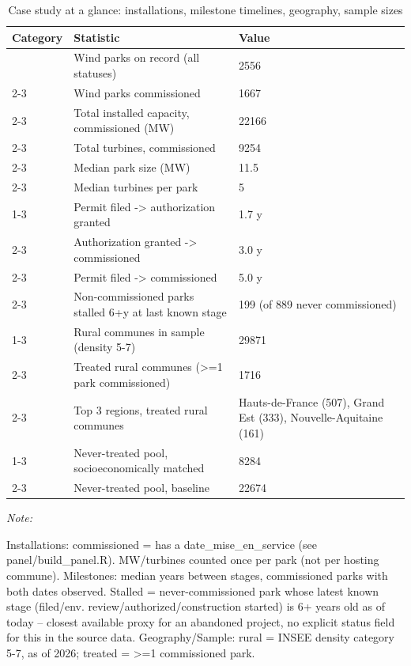 \begin{table}[!h]
\centering
\caption{\label{tab:tab:descriptive_stats}Case study at a glance: installations, milestone timelines, geography, sample sizes}
\centering
\fontsize{9}{11}\selectfont
\begin{threeparttable}
\begin{tabular}[t]{lll}
\toprule
Category & Statistic & Value\\
\midrule
 & Wind parks on record (all statuses) & 2556\\
\cmidrule{2-3}
 & Wind parks commissioned & 1667\\
\cmidrule{2-3}
 & Total installed capacity, commissioned (MW) & 22166\\
\cmidrule{2-3}
 & Total turbines, commissioned & 9254\\
\cmidrule{2-3}
 & Median park size (MW) & 11.5\\
\cmidrule{2-3}
\multirow[t]{-6}{*}{\raggedright\arraybackslash Installations} & Median turbines per park & 5\\
\cmidrule{1-3}
 & Permit filed -> authorization granted & 1.7 y\\
\cmidrule{2-3}
 & Authorization granted -> commissioned & 3.0 y\\
\cmidrule{2-3}
 & Permit filed -> commissioned & 5.0 y\\
\cmidrule{2-3}
\multirow[t]{-4}{*}{\raggedright\arraybackslash Milestones} & Non-commissioned parks stalled 6+y at last known stage & 199 (of 889 never commissioned)\\
\cmidrule{1-3}
 & Rural communes in sample (density 5-7) & 29871\\
\cmidrule{2-3}
 & Treated rural communes (>=1 park commissioned) & 1716\\
\cmidrule{2-3}
\multirow[t]{-3}{*}{\raggedright\arraybackslash Geography} & Top 3 regions, treated rural communes & Hauts-de-France (507), Grand Est (333), Nouvelle-Aquitaine (161)\\
\cmidrule{1-3}
 & Never-treated pool, socioeconomically matched & 8284\\
\cmidrule{2-3}
\multirow[t]{-2}{*}{\raggedright\arraybackslash Sample} & Never-treated pool, baseline & 22674\\
\bottomrule
\end{tabular}
\begin{tablenotes}
\item \textit{Note: } 
\item Installations: commissioned = has a date_mise_en_service (see panel/build_panel.R). MW/turbines counted once per park (not per hosting commune). Milestones: median years between stages, commissioned parks with both dates observed. Stalled = never-commissioned park whose latest known stage (filed/env. review/authorized/construction started) is 6+ years old as of today -- closest available proxy for an abandoned project, no explicit status field for this in the source data. Geography/Sample: rural = INSEE density category 5-7, as of 2026; treated = >=1 commissioned park.
\end{tablenotes}
\end{threeparttable}
\end{table}
